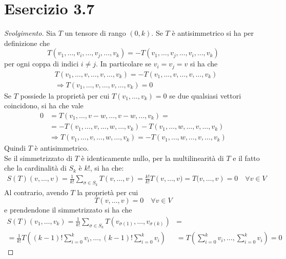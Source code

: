 \documentclass[italian,a4paper,10pt]{article}
\begin{document}
\section*{Esercizio 3.7}
\begin{proof}[Svolgimento]
Sia $T$ un tensore di rango $(0,k)$. Se $T$ è antisimmetrico si ha per definizione che $$T(v_1,\ldots,v_i,\ldots,v_j,\ldots,v_k)=-T(v_1,\ldots,v_j,\ldots,v_i,\ldots,v_k)$$ per ogni coppa di indici $i\neq j$.
In particolare se $v_i=v_j=v$ si ha che 
\begin{align*}
&T(v_1,\ldots,v,\ldots,v,\ldots,v_k)=-T(v_1,\ldots,v,\ldots,v,\ldots,v_k)\\ &\Rightarrow T(v_1,\ldots,v,\ldots,v,\ldots,v_k) =0
\end{align*}
Se $T$ possiede la proprietà per cui $T(v_1,\ldots,v_k)=0$ se due qualsiasi vettori coincidono, si ha che vale
\begin{align*}
0 &=T(v_1,\ldots,v-w,\ldots,v-w,\ldots,v_k) =\\
&= -T(v_1,\ldots,v,\ldots,w,\ldots,v_k)-T(v_1,\ldots,w,\ldots,v,\ldots,v_k)\\
&\Rightarrow T(v_1,\ldots,v,\ldots,w,\ldots,v_k)=-T(v_1,\ldots,w,\ldots,v,\ldots,v_k)
\end{align*}
Quindi $T$ è antisimmetrico.\\

Se il simmetrizzato di $T$ è identicamente nullo, per la multilinearità di $T$ e il fatto che la cardinalità di $S_k$ è $k!$, si ha che:
\begin{align*}
S(T)(v,\ldots,v)=\frac{1}{k!}\sum_{\sigma\in S_k}{T(v,\ldots,v)}= \frac{k!}{k!}T\left(v,\ldots,v)= T(v,\ldots,v\right)=0 \quad \forall v\in V
\end{align*}
Al contrario, avendo $T$ la proprietà per cui $$T(v,\ldots,v)=0 \quad \forall v\in V$$ e prendendone il simmetrizzato si ha che 
\begin{align*}
S(T)(v_1,\ldots,v_k)=\frac{1}{k!}\sum_{\sigma\in S_k}{T(v_{\sigma(1)},\ldots,v_{\sigma(k)})}&=\\
= \frac{1}{k!}T\left((k-1)!\sum_{i=0}^k{v_i},\ldots,(k-1)!\sum_{i=0}^k{v_i}\right) &= 
 T\left(\sum_{i=0}^k{v_i},\ldots,\sum_{i=0}^k{v_i}\right)=0
\end{align*}

\end{proof}
\end{document}
